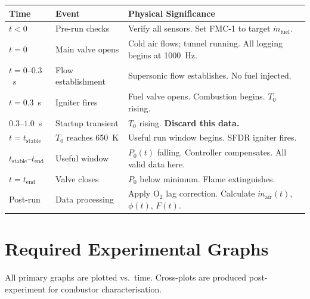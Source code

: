 \documentclass[12pt,a4paper]{report}
\begin{document}
\begin{center}
\renewcommand{\arraystretch}{1.4}
\begin{tabularx}{\linewidth}{@{}llX@{}}
  \toprule
  \textbf{Time} & \textbf{Event} & \textbf{Physical Significance}\\
  \midrule
  $t<0$            & Pre-run checks     & Verify all sensors. Set FMC-1 to target $\dot{m}_\text{fuel}$.\\
  $t=0$            & Main valve opens   & Cold air flows; tunnel running. All logging begins at 1000~Hz.\\
  $t=0$--$0.3$~s   & Flow establishment & Supersonic flow establishes. No fuel injected.\\
  $t=0.3$~s        & Igniter fires      & Fuel valve opens. Combustion begins. $T_0$ rising.\\
  $0.3$--$1.0$~s   & Startup transient  & $T_0$ rising. \textbf{Discard this data.}\\
  $t=t_\text{stable}$ & $T_0$ reaches 650~K & Useful run window begins. SFDR igniter fires.\\
  $t_\text{stable}$--$t_\text{end}$ & Useful window & $P_0(t)$ falling. Controller compensates. All valid data here.\\
  $t=t_\text{end}$ & Valve closes       & $P_0$ below minimum. Flame extinguishes.\\
  Post-run         & Data processing    & Apply O$_2$ lag correction. Calculate $\dot{m}_\text{air}(t)$, $\phi(t)$, $F(t)$.\\
  \bottomrule
\end{tabularx}
\end{center}

\chapter{Required Experimental Graphs}

All primary graphs are plotted vs.\ time. Cross-plots are produced
post-experiment for combustor characterisation.

\newcommand{\graphentry}[4]{%
  \stepcounter{graphnum}
  \subsection*{Graph \thegraphnum: #1}
  \begin{center}
  \renewcommand{\arraystretch}{1.3}
  \begin{tabularx}{\linewidth}{@{}lX@{}}
    \toprule
    \textbf{Axes}              & #2 \\
    \textbf{Scientific purpose} & #3 \\
    \textbf{Expected shape}    & #4 \\
    \bottomrule
  \end{tabularx}
  \end{center}
}
\end{document}
